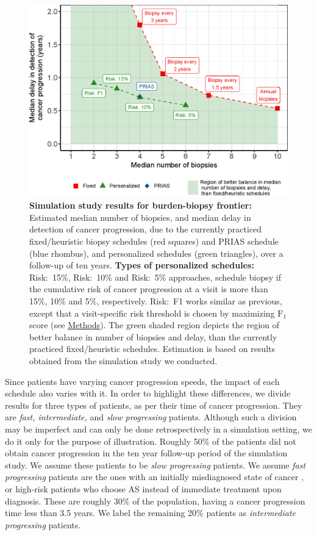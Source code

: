 \begin{figure}[!htb]
\captionsetup{justification=justified}
\centerline{\includegraphics[width=\columnwidth]{images/better_balance_results.eps}}
\caption{\textbf{Simulation study results for burden-biopsy frontier:} Estimated median number of biopsies, and median delay in detection of cancer progression, due to the currently practiced fixed/heuristic biopsy schedules (red squares) and PRIAS schedule (blue rhombus), and personalized schedules (green triangles), over a follow-up of ten years. \textbf{Types of personalized schedules:} Risk:~15\%, Risk:~10\% and Risk:~5\% approaches, schedule biopsy if the cumulative risk of cancer progression at a visit is more than 15\%, 10\% and 5\%, respectively. Risk:~F1 works similar as previous, except that a visit-specific risk threshold is chosen by maximizing $\mbox{F}_1$ score (see \hyperref[sec:methods]{Methods}). The green shaded region depicts the region of better balance in number of biopsies and delay, than the currently practiced fixed/heuristic schedules. Estimation is based on results obtained from the simulation study we conducted. }
\label{fig:better_balance_results}
\end{figure}

Since patients have varying cancer progression speeds, the impact of each schedule also varies with it. In order to highlight these differences, we divide results for three types of patients, as per their time of cancer progression. They are \textit{fast, intermediate,} and \textit{slow progressing} patients. Although such a division may be imperfect and can only be done retrospectively in a simulation setting, we do it only for the purpose of illustration. Roughly 50\% of the patients did not obtain cancer progression in the ten year follow-up period of the simulation study. We assume these patients to be \textit{slow progressing} patients. We assume \textit{fast progressing} patients are the ones with an initially misdiagnosed state of cancer \cite{cooperberg2011outcomes}, or high-risk patients who choose AS instead of immediate treatment upon diagnosis. These are roughly 30\% of the population, having a cancer progression time less than 3.5 years. We label the remaining 20\% patients as \textit{intermediate progressing} patients. 


